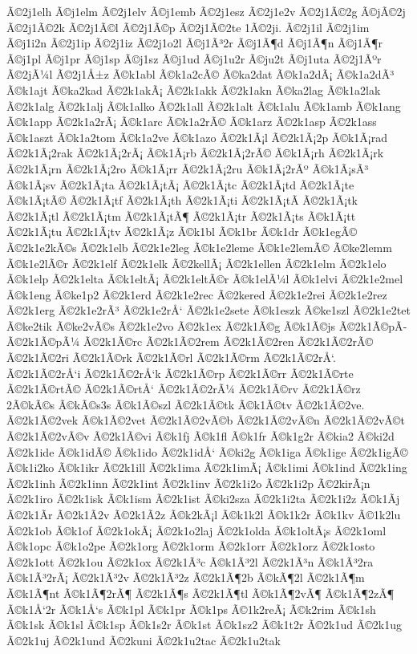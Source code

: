 {Ã©2j1elh
Ã©j1elm
Ã©2j1elv
Ã©j1emb
Ã©2j1esz
Ã©2j1e2v
Ã©2j1Ã©2g
Ã©jÃ©2j
Ã©2j1Ã©2k
Ã©2j1Ã©l
Ã©2j1Ã©p
Ã©2j1Ã©2te
1Ã©2ji.
Ã©2j1il
Ã©2j1im
Ã©j1i2n
Ã©2j1ip
Ã©2j1iz
Ã©2j1o2l
Ã©j1Ã³2r
Ã©j1Ã¶d
Ã©j1Ã¶n
Ã©j1Ã¶r
Ã©j1pl
Ã©j1pr
Ã©j1sp
Ã©j1sz
Ã©j1ud
Ã©j1u2r
Ã©ju2t
Ã©j1uta
Ã©2j1Ãºr
Ã©2jÃ¼l
Ã©2j1Å±z
Ã©k1abl
Ã©k1a2cÃ©
Ã©ka2dat
Ã©k1a2dÃ¡
Ã©k1a2dÃ³
Ã©k1ajt
Ã©ka2kad
Ã©2k1akÃ¡
Ã©2k1akk
Ã©2k1akn
Ã©ka2lag
Ã©k1a2lak
Ã©2k1alg
Ã©2k1alj
Ã©k1alko
Ã©2k1all
Ã©2k1alt
Ã©k1alu
Ã©k1amb
Ã©k1ang
Ã©k1app
Ã©2k1a2rÃ¡
Ã©k1arc
Ã©k1a2rÃ©
Ã©k1arz
Ã©2k1asp
Ã©2k1ass
Ã©k1aszt
Ã©k1a2tom
Ã©k1a2ve
Ã©k1azo
Ã©2k1Ã¡l
Ã©2k1Ã¡2p
Ã©k1Ã¡rad
Ã©2k1Ã¡2rak
Ã©2k1Ã¡2rÃ¡
Ã©k1Ã¡rb
Ã©2k1Ã¡2rÃ©
Ã©k1Ã¡rh
Ã©2k1Ã¡rk
Ã©2k1Ã¡rn
Ã©2k1Ã¡2ro
Ã©k1Ã¡rr
Ã©2k1Ã¡2ru
Ã©k1Ã¡2rÃº
Ã©k1Ã¡sÃ³
Ã©k1Ã¡sv
Ã©2k1Ã¡ta
Ã©2k1Ã¡tÃ¡
Ã©2k1Ã¡tc
Ã©2k1Ã¡td
Ã©2k1Ã¡te
Ã©k1Ã¡tÃ©
Ã©2k1Ã¡tf
Ã©2k1Ã¡th
Ã©2k1Ã¡ti
Ã©2k1Ã¡tÃ­
Ã©2k1Ã¡tk
Ã©2k1Ã¡tl
Ã©2k1Ã¡tm
Ã©2k1Ã¡tÃ¶
Ã©2k1Ã¡tr
Ã©2k1Ã¡ts
Ã©k1Ã¡tt
Ã©2k1Ã¡tu
Ã©2k1Ã¡tv
Ã©2k1Ã¡z
Ã©k1bl
Ã©k1br
Ã©k1dr
Ã©k1egÃ©
Ã©2k1e2kÃ©s
Ã©2k1elb
Ã©2k1e2leg
Ã©k1e2leme
Ã©k1e2lemÃ©
Ã©ke2lemm
Ã©k1e2lÃ©r
Ã©2k1elf
Ã©2k1elk
Ã©2kellÃ¡
Ã©2k1ellen
Ã©2k1elm
Ã©2k1elo
Ã©k1elp
Ã©2k1elta
Ã©k1eltÃ¡
Ã©2k1eltÃ©r
Ã©k1elÃ¼l
Ã©k1elvi
Ã©2k1e2mel
Ã©k1eng
Ã©ke1p2
Ã©2k1erd
Ã©2k1e2rec
Ã©2kered
Ã©2k1e2rei
Ã©2k1e2rez
Ã©2k1erg
Ã©2k1e2rÃ³
Ã©2k1e2rÅ‘
Ã©2k1e2sete
Ã©k1eszk
Ã©ke1szl
Ã©2k1e2tet
Ã©ke2tik
Ã©ke2vÃ©s
Ã©2k1e2vo
Ã©2k1ex
Ã©2k1Ã©g
Ã©k1Ã©js
Ã©2k1Ã©pÃ­
Ã©2k1Ã©pÃ¼
Ã©2k1Ã©rc
Ã©2k1Ã©2rem
Ã©2k1Ã©2ren
Ã©2k1Ã©2rÃ©
Ã©2k1Ã©2ri
Ã©2k1Ã©rk
Ã©2k1Ã©rl
Ã©2k1Ã©rm
Ã©2k1Ã©2rÅ‘.
Ã©2k1Ã©2rÅ‘i
Ã©2k1Ã©2rÅ‘k
Ã©2k1Ã©rp
Ã©2k1Ã©rr
Ã©2k1Ã©rte
Ã©2k1Ã©rtÃ©
Ã©2k1Ã©rtÅ‘
Ã©2k1Ã©2rÃ¼
Ã©2k1Ã©rv
Ã©2k1Ã©rz
2Ã©kÃ©s
Ã©kÃ©s3s
Ã©k1Ã©szl
Ã©2k1Ã©tk
Ã©k1Ã©tv
Ã©2k1Ã©2ve.
Ã©2k1Ã©2vek
Ã©k1Ã©2vet
Ã©2k1Ã©2vÃ©b
Ã©2k1Ã©2vÃ©n
Ã©2k1Ã©2vÃ©t
Ã©2k1Ã©2vÃ©v
Ã©2k1Ã©vi
Ã©k1fj
Ã©k1fl
Ã©k1fr
Ã©k1g2r
Ã©kia2
Ã©ki2d
Ã©2k1ide
Ã©k1idÃ©
Ã©k1ido
Ã©2k1idÅ‘
Ã©ki2g
Ã©k1iga
Ã©k1ige
Ã©2k1igÃ©
Ã©k1i2ko
Ã©k1ikr
Ã©2k1ill
Ã©2k1ima
Ã©2k1imÃ¡
Ã©k1imi
Ã©k1ind
Ã©2k1ing
Ã©2k1inh
Ã©2k1inn
Ã©2k1int
Ã©2k1inv
Ã©2k1i2o
Ã©2k1i2p
Ã©2kirÃ¡n
Ã©2k1iro
Ã©2k1isk
Ã©k1ism
Ã©2k1ist
Ã©ki2sza
Ã©2k1i2ta
Ã©2k1i2z
Ã©k1Ã­j
Ã©2k1Ã­r
Ã©2k1Ã­2v
Ã©2k1Ã­2z
Ã©k2kÃ¡l
Ã©k1k2l
Ã©k1k2r
Ã©k1kv
Ã©1k2lu
Ã©2k1ob
Ã©k1of
Ã©2k1okÃ¡
Ã©2k1o2laj
Ã©2k1olda
Ã©k1oltÃ¡s
Ã©2k1oml
Ã©k1opc
Ã©k1o2pe
Ã©2k1org
Ã©2k1orm
Ã©2k1orr
Ã©2k1orz
Ã©2k1osto
Ã©2k1ott
Ã©2k1ou
Ã©2k1ox
Ã©2k1Ã³c
Ã©k1Ã³2l
Ã©2k1Ã³n
Ã©k1Ã³2ra
Ã©k1Ã³2rÃ¡
Ã©2k1Ã³2v
Ã©2k1Ã³2z
Ã©2k1Ã¶2b
Ã©kÃ¶2l
Ã©2k1Ã¶m
Ã©k1Ã¶nt
Ã©k1Ã¶2rÃ¶
Ã©2k1Ã¶s
Ã©2k1Ã¶tl
Ã©k1Ã¶2vÃ¶
Ã©k1Ã¶2zÃ¶
Ã©k1Å‘2r
Ã©k1Å‘s
Ã©k1pl
Ã©k1pr
Ã©k1ps
Ã©1k2reÃ¡
Ã©k2rim
Ã©k1sh
Ã©k1sk
Ã©k1sl
Ã©k1sp
Ã©k1s2r
Ã©k1st
Ã©k1sz2
Ã©k1t2r
Ã©2k1ud
Ã©2k1ug
Ã©2k1uj
Ã©2k1und
Ã©2kuni
Ã©2k1u2tac
Ã©2k1u2tak
}

